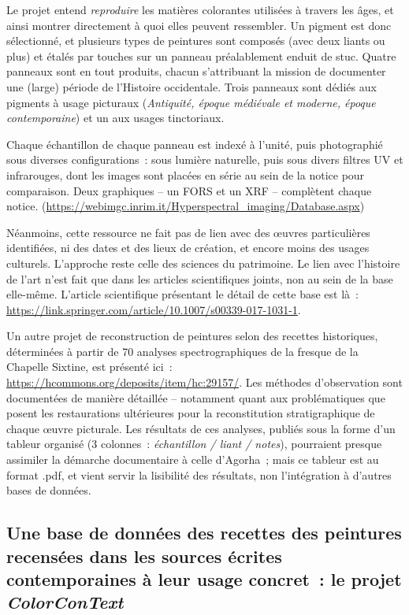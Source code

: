 \documentclass[a4paper,12pt, twoside]{book}
\begin{document}
Le projet entend \textit{reproduire} les matières colorantes utilisées à travers les âges, et ainsi montrer directement à quoi elles peuvent ressembler. Un pigment est donc sélectionné, et plusieurs types de peintures sont composés (avec deux liants ou plus) et étalés par touches sur un panneau préalablement enduit de stuc. Quatre panneaux sont en tout produits, chacun s’attribuant la mission de documenter une (large) période de l’Histoire occidentale. Trois panneaux sont dédiés aux pigments à usage picturaux (\textit{Antiquité, époque médiévale et moderne, époque contemporaine}) et un aux usages tinctoriaux.

Chaque échantillon de chaque panneau est indexé à l’unité, puis photographié sous diverses configurations~: sous lumière naturelle, puis sous divers filtres UV et infrarouges, dont les images sont placées en série au sein de la notice pour comparaison. Deux graphiques – un FORS et un XRF – complètent chaque notice. (\url{https://webimgc.inrim.it/Hyperspectral_imaging/Database.aspx})

Néanmoins, cette ressource ne fait pas de lien avec des œuvres particulières identifiées, ni des dates et des lieux de création, et encore moins des usages culturels. L’approche reste celle des sciences du patrimoine. Le lien avec l’histoire de l’art n’est fait que dans les articles scientifiques joints, non au sein de la base elle-même. L’article scientifique présentant le détail de cette base est là~: \url{https://link.springer.com/article/10.1007/s00339-017-1031-1}.

Un autre projet de reconstruction de peintures selon des recettes historiques, déterminées à partir de 70 analyses spectrographiques de la fresque de la Chapelle Sixtine, est présenté ici~: \url{https://hcommons.org/deposits/item/hc:29157/}. Les méthodes d’observation sont documentées de manière détaillée – notamment quant aux problématiques que posent les restaurations ultérieures pour la reconstitution stratigraphique de chaque œuvre picturale. Les résultats de ces analyses, publiés sous la forme d’un tableur organisé (3 colonnes~: \textit{échantillon / liant / notes}), pourraient presque assimiler la démarche documentaire à celle d’Agorha~; mais ce tableur est au format .pdf, et vient servir la lisibilité des résultats, non l’intégration à d’autres bases de données.

\subsection*{Une base de données des recettes des peintures recensées dans les sources écrites contemporaines à leur usage concret~: le projet \textit{ColorConText}}
\end{document}
